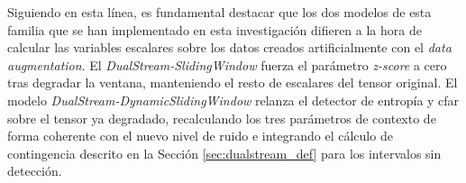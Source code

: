 Siguiendo en esta línea, es fundamental destacar que los dos modelos de esta familia que se han implementado en esta investigación difieren a la hora de calcular las variables escalares sobre los datos creados artificialmente con el \textit{data augmentation}. El \textit{DualStream-SlidingWindow} fuerza el parámetro \textit{z-score} a cero tras degradar la ventana, manteniendo el resto de escalares del tensor original. El modelo \textit{DualStream-DynamicSlidingWindow} relanza el detector de entropía y \gls{cfar} sobre el tensor ya degradado, recalculando los tres parámetros de contexto de forma coherente con el nuevo nivel de ruido e integrando el cálculo de contingencia descrito en la Sección \ref{sec:dualstream_def} para los intervalos sin detección.
